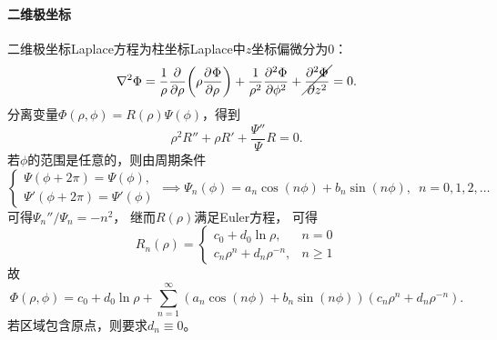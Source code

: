 \paragraph{二维极坐标}
二维极坐标Laplace方程为柱坐标Laplace中$z$坐标偏微分为0：
\begin{equation}
    \laplacian\Phi = \frac1\rho\pp\rho\biggp{\rho\pv\Phi\rho} + \frac1{\rho^2}\pv[2]\Phi\phi + \cancel{\pv[2]\Phi z}%
    = 0.
\end{equation}
分离变量$\Phi(\rho,\phi) = R(\rho)\Psi(\phi)$，得到
\[
    \rho^2R'' + \rho R' + \frac{\Psi''}\Psi R = 0.
\]
若$\phi$的范围是任意的，则由周期条件
\[
    \begin{cases}
        \Psi(\phi + 2\pi) = \Psi(\phi),\\
        \Psi'(\phi + 2\pi) = \Psi'(\phi)
    \end{cases} \implies
    \Psi_n(\phi) = a_n\cos(n\phi) + b_n\sin(n\phi),
    \enspace n = 0,1,2,\ldots
\]
可得$\Psi_n''/\Psi_n = -n^2$，
继而$R(\rho)$满足Euler方程，
可得
\begin{equation}
    \label{eq:ed-cylindrical-laplace-radial}
    R_n(\rho) =
    \begin{cases}
        c_0 + d_0\ln\rho,&n = 0\\
        c_n\rho^n + d_n\rho^{-n},&n \geqslant 1
    \end{cases}
\end{equation}
故
\begin{equation}
    \Phi(\rho,\phi) = c_0 + d_0\ln\rho + \sum_{n=1}^{\infty}(a_n\cos(n\phi) + b_n\sin(n\phi))(c_n\rho^n + d_n\rho^{-n}).
\end{equation}
若区域包含原点，则要求$d_n \equiv 0$。
